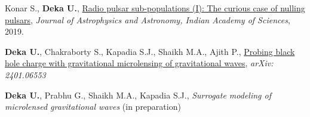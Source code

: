 \begin{itemize}[noitemsep]
    {
    \item Konar S., \textbf{Deka U.}, \href{https://www.ias.ac.in/article/fulltext/joaa/040/05/0042}{Radio pulsar sub-populations (I): The curious case of nulling pulsars}, \textit{Journal of Astrophysics and Astronomy, Indian Academy of Sciences}, 2019.
    }\end{itemize}
    
    \begin{itemize}[noitemsep]
    {
    \item \textbf{Deka U.}, Chakraborty S., Kapadia S.J., Shaikh M.A., Ajith P., \href{https://arxiv.org/pdf/2401.06553}{Probing black hole charge with gravitational microlensing of gravitational waves}, \textit{arXiv: 2401.06553}
    }\end{itemize}
    
    \begin{itemize}[noitemsep]
    {
    \item \textbf{Deka U.}, Prabhu G., Shaikh M.A., Kapadia S.J., \textit{Surrogate modeling of microlensed gravitational waves} (in preparation)
    }\end{itemize}